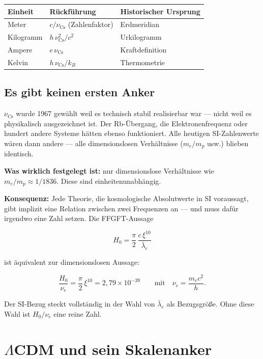 \begin{center}
\begin{tabular}{lll}
\toprule
Einheit & Rückführung & Historischer Ursprung \\
\midrule
Meter   & $c/\nu_\text{Cs}$ (Zahlenfaktor) & Erdmeridian \\
Kilogramm & $h\,\nu_\text{Cs}^2/c^2$ & Urkilogramm \\
Ampere  & $e\,\nu_\text{Cs}$ & Kraftdefinition \\
Kelvin  & $h\,\nu_\text{Cs}/k_B$ & Thermometrie \\
\bottomrule
\end{tabular}
\end{center}

\section{Es gibt keinen ersten Anker}

$\nu_\text{Cs}$ wurde 1967 gewählt weil es technisch stabil
realisierbar war — nicht weil es physikalisch ausgezeichnet ist.
Der Rb-Übergang, die Elektronenfrequenz oder hundert andere Systeme
hätten ebenso funktioniert. Alle heutigen SI-Zahlenwerte wären dann
andere — alle dimensionslosen Verhältnisse ($m_e/m_p$ usw.) blieben
identisch.

\textbf{Was wirklich festgelegt ist:} nur dimensionslose Verhältnisse
wie $m_e/m_p \approx 1/1836$. Diese sind einheitenunabhängig.

\textbf{Konsequenz:} Jede Theorie, die kosmologische Absolutwerte in SI
voraussagt, gibt implizit eine Relation zwischen zwei Frequenzen an —
und muss dafür irgendwo eine Zahl setzen. Die FFGFT-Aussage

\[
  H_0 = \frac{\pi}{2}\,\frac{c\,\xi^{10}}{\bar\lambda_e}
\]

ist äquivalent zur dimensionslosen Aussage:

\[
  \frac{H_0}{\nu_e} = \frac{\pi}{2}\,\xi^{10} = 2{,}79\times10^{-39}
  \qquad\text{mit}\quad \nu_e = \frac{m_e c^2}{h}.
\]

Der SI-Bezug steckt vollständig in der Wahl von $\bar\lambda_e$ als
Bezugsgröße. Ohne diese Wahl ist $H_0/\nu_e$ eine reine Zahl.

\chapter{$\Lambda$CDM und sein Skalenanker}

